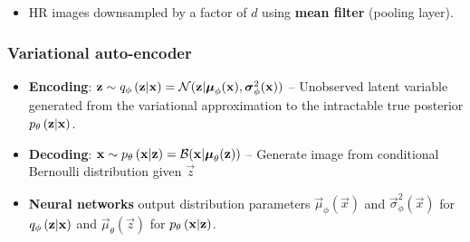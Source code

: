 \begin{itemize}
	\item HR images downsampled by a factor of $d$ using \textbf{mean filter} (pooling layer).
\end{itemize}

\subsubsection{Variational auto-encoder}
\label{ssub:vae}

\begin{itemize}
	\item \textbf{Encoding}: $\bm{\mathrm{z}} \sim q_{\phi}\left(\bm{\mathrm{z}}|\bm{\mathrm{x}}\right) = \mathcal{N}( \bm{\mathrm{z}}|\bm{\mathrm{\mu}}_\phi(\bm{\mathrm{x}}),\bm{\mathrm{\sigma}}^2_\phi(\bm{\mathrm{x}}))$ -- Unobserved latent variable generated from the variational approximation to the intractable true posterior $p_{\theta}\left(\bm{\mathrm{z}}|\bm{\mathrm{x}}\right)$.
	\item \textbf{Decoding}: $\bm{\mathrm{x}} \sim p_{\theta}\left(\bm{\mathrm{x}}|\bm{\mathrm{z}}\right)=\mathcal{B}( \bm{\mathrm{x}}|\bm{\mathrm{\mu}}_\theta(\bm{\mathrm{z}}))$ -- Generate image from conditional Bernoulli distribution given $\vec{z}$
	\item \textbf{Neural networks} output distribution parameters $\vec{\mu}_\phi(\vec{x})$ and $\vec{\sigma}^2_\phi(\vec{x})$ for $q_{\phi}\left(\bm{\mathrm{z}}|\bm{\mathrm{x}}\right)$ and $\vec{\mu}_\theta(\vec{z})$ for $p_{\theta}\left(\bm{\mathrm{x}}|\bm{\mathrm{z}}\right)$.

\end{itemize}
